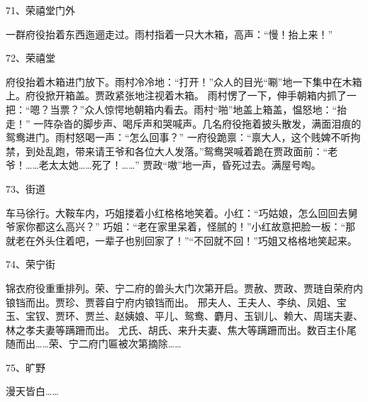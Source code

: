 71、荣禧堂门外\par
一群府役抬着东西迤逦走过。雨村指着一只大木箱，高声：“慢！抬上来！”

72、荣禧堂\par
府役抬着木箱进门放下。雨村冷冷地：“打开！”众人的目光“唰”地一下集中在木箱上。府役掀开箱盖。贾政紧张地注视着木箱。
雨村愣了一下，伸手朝箱内抓了一把：“嗯？当票？”众人惊愕地朝箱内看去。雨村“啪”地盖上箱盖，愠怒地：“抬走！”
一阵杂沓的脚步声、喝斥声和哭喊声。几名府役拖着披头散发，满面泪痕的鸳鸯进门。雨村怒喝一声：“怎么回事？”
一府役跪禀：“禀大人，这个贱婢不听拘禁，到处乱跑，带来请王爷和各位大人发落。”鸳鸯哭喊着跪在贾政面前：“老爷！……老太太她……死了！……”
贾政“嗷”地一声，昏死过去。满屋号啕。

73、街道\par
车马徐行。大鞍车内，巧姐搂着小红格格地笑着。小红：“巧姑娘，怎么回回去舅爷家你都这么高兴？”
巧姐：“老在家里呆着，怪腻的！”小红故意把脸一板：“那就老在外头住着吧，一辈子也别回家了！”“不回就不回！”巧姐又格格地笑起来。

74、荣宁街\par
锦衣府役重重排列。荣、宁二府的兽头大门次第开启。贾赦、贾政、贾琏自荣府内锒铛而出。贾珍、贾蓉自宁府内锒铛而出。
邢夫人、王夫人、李纨、凤姐、宝玉、宝钗、贾环、贾兰、赵姨娘、平儿、鸳鸯、麝月、玉钏儿、赖大、周瑞夫妻、林之孝夫妻等蹒跚而出。
尤氏、胡氏、来升夫妻、焦大等蹒跚而出。数百主仆尾随而出……荣、宁二府门匾被次第摘除……

75、旷野\par
漫天皆白……